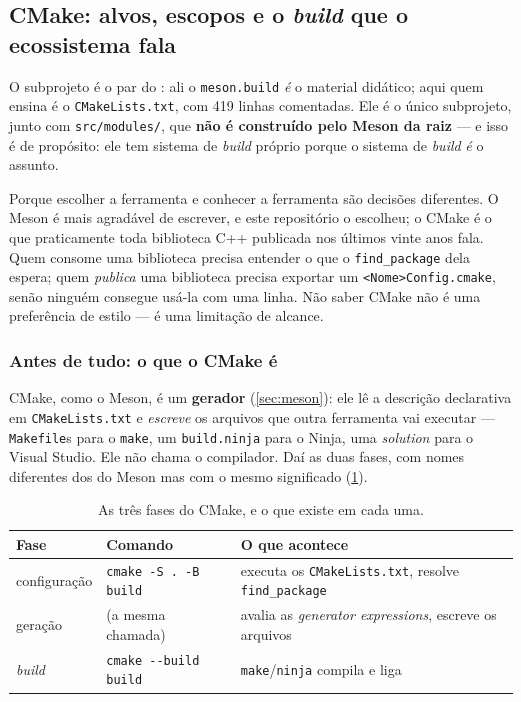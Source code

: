 \subsection{CMake: alvos, escopos e o \emph{build} que o ecossistema fala}
\label{sec:cmake}

O subprojeto  é o par do : ali o
\texttt{meson.build} \emph{é} o material didático; aqui quem ensina é o
\texttt{CMakeLists.txt}, com 419 linhas comentadas. Ele é o único subprojeto,
junto com \texttt{src/modules/}, que \textbf{não é construído pelo Meson da
raiz} --- e isso é de propósito: ele tem sistema de \emph{build} próprio porque
o sistema de \emph{build} \emph{é} o assunto.

\begin{porque}
Porque escolher a ferramenta e conhecer a ferramenta são decisões diferentes.
O Meson é mais agradável de escrever, e este repositório o escolheu; o CMake é
o que praticamente toda biblioteca C++ publicada nos últimos vinte anos fala.
Quem consome uma biblioteca precisa entender o que o \texttt{find\_package}
dela espera; quem \emph{publica} uma biblioteca precisa exportar um
\texttt{<Nome>Config.cmake}, senão ninguém consegue usá-la com uma linha. Não
saber CMake não é uma preferência de estilo --- é uma limitação de alcance.
\end{porque}

\subsubsection{Antes de tudo: o que o CMake é}

CMake, como o Meson, é um \textbf{gerador} (\cref{sec:meson}): ele lê a
descrição declarativa em \texttt{CMakeLists.txt} e \emph{escreve} os arquivos
que outra ferramenta vai executar --- \texttt{Makefile}s para o \texttt{make},
um \texttt{build.ninja} para o Ninja, uma \emph{solution} para o Visual Studio.
Ele não chama o compilador. Daí as duas fases, com nomes diferentes dos do
Meson mas com o mesmo significado (\cref{tab:cmake-fases}).

\begin{table}[htbp]
\centering
\caption{As três fases do CMake, e o que existe em cada uma.}
\label{tab:cmake-fases}
\footnotesize
\begin{tabular}{@{}lll@{}}
\toprule
\textbf{Fase} & \textbf{Comando} & \textbf{O que acontece} \\
\midrule
configuração & \texttt{cmake -S . -B build} & executa os \texttt{CMakeLists.txt}, resolve \texttt{find\_package} \\
geração      & (a mesma chamada)            & avalia as \emph{generator expressions}, escreve os arquivos \\
\emph{build} & \texttt{cmake -{}-build build} & \texttt{make}/\texttt{ninja} compila e liga \\
\bottomrule
\end{tabular}
\end{table}

